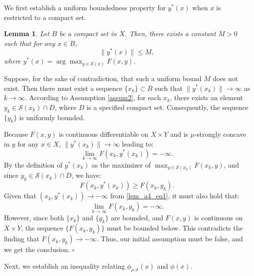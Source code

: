 \documentclass{article}
\newtheorem{lemma}[theorem]{Lemma}
\newenvironment{proof}[1][Proof]{\par
	\normalfont\topsep6pt\relax
	\trivlist\item[\hskip\labelsep\itshape #1.]\ignorespaces
}{%
	\hfill\ensuremath{\square}\endtrivlist
}
\begin{document}
We first establish a uniform boundedness property for $y^*(x)$ when $x$ is restricted to a compact set.
\begin{lemma}\label{lem_a4}
Let $B$ be a compact set in $X$. Then, there exists a constant $M > 0$ such that for any $x \in B$,
 \[
 \|y^*(x)\| \le M,
 \]    
 where $y^*(x) = \arg\max_{y \in \mathcal{S}(x)}F(x,y)$.
\end{lemma}
\begin{proof}
    Suppose, for the sake of contradiction, that such a uniform bound $M$ does not exist. Then there must exist a sequence $\{x_k\} \subset B$ such that $\|y^*(x_k)\| \rightarrow \infty$ as $k\rightarrow \infty$. According to Assumption \ref{assum2}, for each $x_k$, there exists an element $y_k \in \mathcal{S}(x_k) \cap D$, where $D$ is a specified compact set. Consequently, the sequence $\{y_k\}$ is uniformly bounded.

    Because $F(x,y)$ is continuous differentiable on $X \times Y$ and is $\mu$-strongly concave in $y$ for any $x \in X$, $\|y^*(x_k)\| \rightarrow \infty$ leading to:
\begin{equation}\label{lem_a4_eq1}
    \lim_{k \rightarrow \infty} F(x_{k},y^*(x_{k})) = - \infty.
\end{equation}    
    By the definition of $y^*(x_k)$ as the maximizer of  $ \max_{y \in \mathcal{S}(x_k)}F(x_k,y)$, and since $y_k \in \mathcal{S}(x_k) \cap D$, we have:
    \[
    F(x_{k},y^*(x_{k})) \ge F(x_{k},y_k).
    \]
    Given that $(x_{k},y^*(x_{k})) \rightarrow - \infty$ from \eqref{lem_a4_eq1}, it must also hold that:
    \[
        \lim_{k \rightarrow \infty} F(x_{k},y_k) = - \infty.
    \]
    However, since both $\{x_k\}$ and $\{y_k\}$ are bounded, and $F(x,y)$ is continuous on $X \times Y$, the sequence $\{F(x_{k},y_k)\}$ must be bounded below. This contradicts the finding that $F(x_{k},y_k) \rightarrow - \infty$.  Thus, our initial assumption must be false, and we get the conclusion.
\end{proof}

Next, we establish an inequality relating $ \phi_{\rho,\sigma}(x)$ and $\phi(x)$. 
\end{document}
